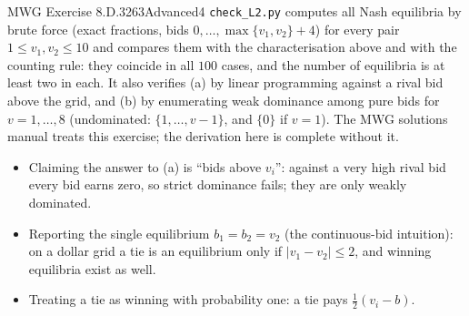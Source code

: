 \begin{exsol}{MWG Exercise 8.D.3}{263}{Advanced}{4}
\verify \texttt{check\_L2.py} computes all Nash equilibria by brute force (exact fractions, bids
$0, \dots, \max\{v_1,v_2\} + 4$) for every pair $1 \le v_1, v_2 \le 10$ and compares them with the characterisation above and with the counting
rule: they coincide in all $100$ cases, and the number of equilibria is at least two in each. It also
verifies (a) by linear programming against a rival bid above the grid, and (b) by enumerating weak
dominance among pure bids for $v = 1, \dots, 8$ (undominated: $\{1, \dots, v - 1\}$, and $\{0\}$ if $v = 1$). The MWG solutions manual
treats this exercise; the derivation here is complete without it.

\mistakes
\begin{itemize}
  \item Claiming the answer to (a) is ``bids above $v_i$'': against a very high rival bid every bid
  earns zero, so strict dominance fails; they are only weakly dominated.
  \item Reporting the single equilibrium $b_1 = b_2 = v_2$ (the continuous-bid intuition): on a
  dollar grid a tie is an equilibrium only if $|v_1 - v_2| \le 2$, and winning equilibria exist as well.
  \item Treating a tie as winning with probability one: a tie pays $\tfrac12 (v_i - b)$.
\end{itemize}
\end{exsol}

